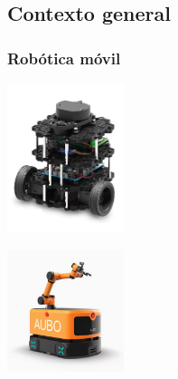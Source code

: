 \documentclass{beamer}
\begin{document}
\subsection{Contexto general}
\begin{frame}
\frametitle{Robótica móvil}
\centering
\begin{minipage}{0.45\textwidth}
    \centering
    \includegraphics[width=3.4cm]{figs/turtlebot3burguer.jpg}
\end{minipage}
\hfill
\begin{minipage}{0.45\textwidth}
    \centering
    \includegraphics[width=3.4cm]{figs/ttt.png}
\end{minipage}
\end{frame}
\end{document}

